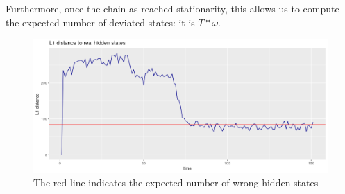Furthermore, once the chain as reached stationarity, this allows us to compute the expected number of deviated states: it is $ T * \omega$. 

\begin{figure}
	\includegraphics[width=\linewidth]{../forward_algorithm/l1_hidden_state_distance.png}
	\caption{The red line indicates the expected number of wrong hidden states}
	\label{l1_wrong_states}
\end{figure}









